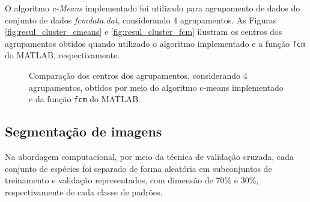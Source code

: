 \documentclass[12pt,a4paper]{article}
\numberwithin{equation}{section}
\begin{document}
O algoritmo \textit{c-Means} implementado foi utilizado para agrupamento de dados do conjunto de dados \textit{fcmdata.dat}, considerando 4 agrupamentos. As Figuras \ref{fig:resul_cluster_cmeans} e \ref{fig:resul_cluster_fcm} ilustram os centros dos agrupamentos obtidos quando utilizado o algoritmo implementado e a função \texttt{fcm} do MATLAB, respectivamente.

\begin{figure}[!htbp]
	\centering
	\caption{Comparação dos centros dos agrupamentos, considerando 4 agrupamentos, obtidos por meio do algoritmo c-means implementado e da função \texttt{fcm} do MATLAB.}
\end{figure}

\subsection{Segmentação de imagens}
\label{subsection:seg}

Na abordagem computacional, por meio da técnica de validação cruzada, cada conjunto de espécies foi separado de forma aleatória em subconjuntos de treinamento e validação representados, com dimensão de $70\%$ e $30\%$, respectivamente de cada classe de padrões.
\end{document}
